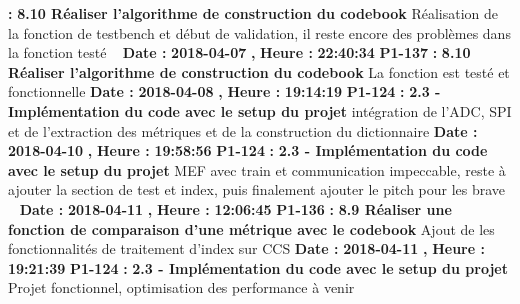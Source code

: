 \documentclass{article}%
\begin{document}
\textbf{ : }%
\textbf{ 8.10 Réaliser l'algorithme de construction du codebook}%
\newline%
\newline%
%
Réalisation de la fonction de testbench et début de validation, il reste encore des problèmes dans la fonction testé\newline%
~\newline%
\newline%
%
\textbf{Date : }%
\textbf{2018{-}04{-}07}%
\textbf{,}%
\textbf{ Heure : }%
\textbf{22:40:34}%
\newline%
%
\textbf{P1{-}137 }%
\textbf{ : }%
\textbf{ 8.10 Réaliser l'algorithme de construction du codebook}%
\newline%
\newline%
%
La fonction est testé et fonctionnelle\newline%
\newline%
%
\textbf{Date : }%
\textbf{2018{-}04{-}08}%
\textbf{,}%
\textbf{ Heure : }%
\textbf{19:14:19}%
\newline%
%
\textbf{P1{-}124 }%
\textbf{ : }%
\textbf{ 2.3 {-} Implémentation du code avec le setup du projet}%
\newline%
\newline%
%
intégration de l'ADC, SPI et de l'extraction des métriques et de la construction du dictionnaire\newline%
\newline%
%
\textbf{Date : }%
\textbf{2018{-}04{-}10}%
\textbf{,}%
\textbf{ Heure : }%
\textbf{19:58:56}%
\newline%
%
\textbf{P1{-}124 }%
\textbf{ : }%
\textbf{ 2.3 {-} Implémentation du code avec le setup du projet}%
\newline%
\newline%
%
MEF avec train et communication impeccable, reste à ajouter la section de test et index, puis finalement ajouter le pitch pour les brave\newline%
~\newline%
\newline%
%
\textbf{Date : }%
\textbf{2018{-}04{-}11}%
\textbf{,}%
\textbf{ Heure : }%
\textbf{12:06:45}%
\newline%
%
\textbf{P1{-}136 }%
\textbf{ : }%
\textbf{ 8.9 Réaliser une fonction de comparaison d'une métrique avec le codebook}%
\newline%
\newline%
%
Ajout de les fonctionnalités de traitement d'index sur CCS\newline%
\newline%
%
\textbf{Date : }%
\textbf{2018{-}04{-}11}%
\textbf{,}%
\textbf{ Heure : }%
\textbf{19:21:39}%
\newline%
%
\textbf{P1{-}124 }%
\textbf{ : }%
\textbf{ 2.3 {-} Implémentation du code avec le setup du projet}%
\newline%
\newline%
%
Projet fonctionnel, optimisation des performance à venir\newline%
\newline%
%
\newpage
\end{document}
